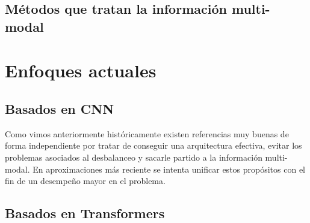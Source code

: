 		
		\subsection{Métodos que tratan la información multi-modal}


\section{Enfoques actuales}
	\subsection{Basados en CNN}
	
	Como vimos anteriormente históricamente existen referencias muy buenas de forma independiente por tratar de conseguir una arquitectura efectiva, evitar los problemas asociados al desbalanceo y sacarle partido a la información multi-modal. En aproximaciones más reciente se intenta unificar estos propósitos con el fin de un desempeño mayor en el problema.
	
	
	
	
	\subsection{Basados en Transformers}

